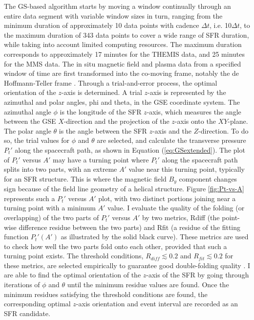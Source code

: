 The GS-based algorithm starts by moving a window continually through an entire data segment with variable window sizes in turn, ranging from the minimum duration of approximately 10 data points with cadence $\Delta t$, i.e. 10$\Delta t$, to the maximum duration of 343 data points to cover a wide range of SFR duration, while taking into account limited computing resources. The maximum duration corresponds to approximately 17 minutes for the THEMIS data, and 25 minutes for the MMS data. The in situ magnetic field and plasma data from a specified window of time are first transformed into the co-moving frame, notably the de Hoffmann-Teller frame \citep{deHoffman-Teller:1950}. Through a trial-and-error process, the optimal orientation of the $z$-axis is determined. A trial $z$-axis is represented by the azimuthal and polar angles, \gls{phi} and \gls{theta}, in the GSE coordinate system. The azimuthal angle $\phi$ is the longitude of the SFR $z$-axis, which measures the angle between the GSE $X$-direction and the projection of the $z$-axis onto the $XY$-plane. The polar angle $\theta$ is the angle between the SFR $z$-axis and the $Z$-direction. To do so, the trial values for $\phi$ and $\theta$ are selected, and calculate the transverse pressure $P_t'$ along the spacecraft path, as shown in Equation (\ref{eq:GSextended}). The plot of $P_t'$ versus $A'$ may have a turning point where $P_t'$ along the spacecraft path splits into two parts, with an extreme $A'$ value near this turning point, typically for an SFR structure. This is where the magnetic field $B_y$ component changes sign because of the field line geometry of a helical structure. Figure \ref{fig:Pt-vs-A} represents such a $P_t'$ versus $A'$ plot, with two distinct portions joining near a turning point with a minimum $A'$ value. I evaluate the quality of the folding (or overlapping) of the two parts of $P_t'$ versus $A'$ by two metrics, \gls{Rdiff} (the point-wise difference residue between the two parts) and \gls{Rfit} (a residue of the fitting function $P_t'(A')$ as illustrated by the solid black curve). These metrics are used to check how well the two parts fold onto each other, provided that such a turning point exists. The threshold conditions, $R_{diff}\lesssim 0.2$ and $R_{fit}\lesssim 0.2$ for these metrics, are selected empirically to guarantee good double-folding quality \citep{Hu:2018}. I are able to find the optimal orientation of the $z$-axis of the SFR by going through iterations of $\phi$ and $\theta$ until the minimum residue values are found. Once the minimum residues satisfying the threshold conditions are found, the corresponding optimal $z$-axis orientation and event interval are recorded as an SFR candidate.

